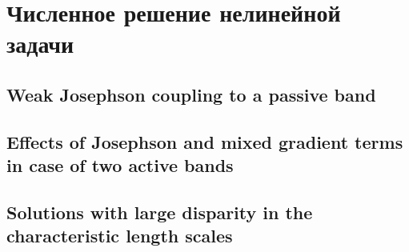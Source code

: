 \chapter{Численное решение нелинейной задачи}
\label{ch:4}

\section{Weak Josephson coupling to a passive band}
\label{sec:4-1}

\section{Effects of Josephson and mixed gradient terms in case of two active
  bands}
\label{sec:4-2}

\section{Solutions with large disparity in the characteristic length scales}
\label{sec:4-3}
